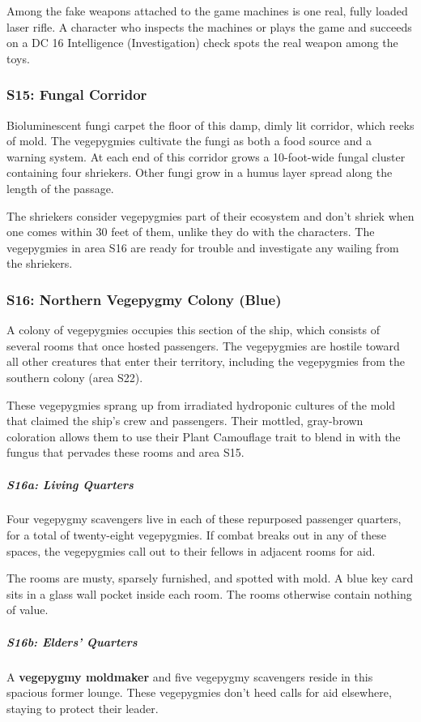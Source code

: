 \documentclass[10pt,a4paper,twoside,bg=print,twocolumn,openany,nodeprecatedcode]{dndbook}
\begin{document}
Among the fake weapons attached to the game machines is one real, fully loaded laser rifle. A character who inspects the machines or plays the game and succeeds on a DC 16 Intelligence (Investigation) check spots the real weapon among the toys.

\subsubsection{S15: Fungal Corridor}
Bioluminescent fungi carpet the floor of this damp, dimly lit corridor, which reeks of mold. The vegepygmies cultivate the fungi as both a food source and a warning system. At each end of this corridor grows a 10-foot-wide fungal cluster containing four shriekers. Other fungi grow in a humus layer spread along the length of the passage.

The shriekers consider vegepygmies part of their ecosystem and don't shriek when one comes within 30 feet of them, unlike they do with the characters. The vegepygmies in area S16 are ready for trouble and investigate any wailing from the shriekers.

\subsubsection{S16: Northern Vegepygmy Colony (Blue)}
A colony of vegepygmies occupies this section of the ship, which consists of several rooms that once hosted passengers. The vegepygmies are hostile toward all other creatures that enter their territory, including the vegepygmies from the southern colony (area S22).

These vegepygmies sprang up from irradiated hydroponic cultures of the mold that claimed the ship's crew and passengers. Their mottled, gray-brown coloration allows them to use their Plant Camouflage trait to blend in with the fungus that pervades these rooms and area S15.

\subparagraph{S16a: Living Quarters}
Four vegepygmy scavengers live in each of these repurposed passenger quarters, for a total of twenty-eight vegepygmies. If combat breaks out in any of these spaces, the vegepygmies call out to their fellows in adjacent rooms for aid.

The rooms are musty, sparsely furnished, and spotted with mold. A blue key card sits in a glass wall pocket inside each room. The rooms otherwise contain nothing of value.

\subparagraph{S16b: Elders' Quarters}
A \textbf{vegepygmy moldmaker} and five vegepygmy scavengers reside in this spacious former lounge. These vegepygmies don't heed calls for aid elsewhere, staying to protect their leader.
\end{document}
